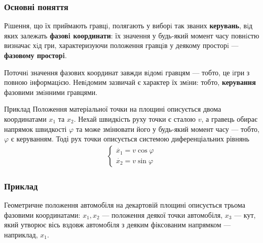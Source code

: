 \documentclass[10pt,pdf,aspectratio=169]{beamer}
\newcommand{\vf}{\varphi}
\renewcommand{\d}[1]{\dot{#1}}
\begin{document}
    \begin{frame}
        \frametitle{Основні поняття}
    
        Рiшення, що їх приймають гравцi, полягають у виборi так званих \textbf{керувань}, вiд яких залежать \textbf{фазовi координати}: 
        їх значення у будь-який момент часу повнiстю визначає хiд гри, характеризуючи положення гравцiв у деякому просторi — \textbf{фазовому просторi}. 

        Поточнi значення фазових координат завжди вiдомi
        гравцям — тобто, це iгри з повною iнформацiєю. Невiдомим зазвичай є
        характер їх змiни: тобто, \textbf{керування} фазовими змiнними гравцями.
        \begin{block}{Приклад}
            Положення матеріальної точки на площині описується двома координатами $x_1$ та $x_2$. 
            Нехай швидкість руху точки є сталою $v$, а гравець обирає напрямок швидкості $\vf$ та може змінювати його у будь-який момент часу --- тобто, $\vf$
            є керуванням. Тоді рух точки описується системою диференціальних рівнянь
            \begin{gather*}
                \begin{cases}
                    \d{x_1} = v \cos \vf \\
                    \d{x_2} = v \sin \vf
                \end{cases}
            \end{gather*}
        \end{block}
    \end{frame}
    \begin{frame}
        \frametitle{Приклад}
    
        Геометричне положення автомобіля на декартовій площині описується трьома фазовими координатами:
        $x_1, x_2$ --- положення деякої точки автомобіля, $x_3$ --- кут, який утворює вісь вздовж автомобіля
        з деяким фіксованим напрямком --- наприклад, $x_1$.
        \begin{center}
        \end{center}
    \end{frame}
\end{document}
